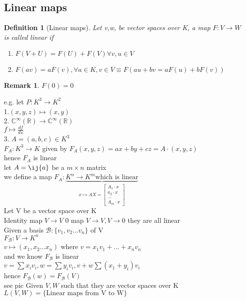 \documentclass{article}
\newtheorem*{definition}{Definition}
\newtheorem*{remark}{Remark}
\newcommand{\R}{\mathbb{R}}
\newcommand{\C}{\mathbb{C}}
\newcommand\m[1]{\begin{bmatrix}#1\end{bmatrix}}
\newcommand{\cd}{\cdot}
\newcommand{\vs}{v_1,v_2\dots v_n}
\newcommand{\mn}{m \times n}
\newcommand{\brac}[1]{\{#1\}}
\begin{document}
\subsection{Linear maps}
\begin{definition}
    [Linear maps] Let v,w, be vector spaces over K, a map $F: V\to W$ is called linear if 
    \begin{enumerate}
        \item $F(V+U)=F(U)+F(V) \forall v,u \in V$
        \item $F(av)=aF(v), \forall a \in K, v\in V \equiv F(au+bv=aF(u)+bF(v))$
    \end{enumerate}
\end{definition}
\begin{remark}
    $F(0)=0$
\end{remark}
e.g. let $P: K^3\to K^2$
\\1.$(x,y,z) \mapsto (x,y)$\\
2. $\C^\infty (\R) \to \C^\infty(\R)$\\$f \mapsto \frac{df}{dx}$\\
3. $A=(a,b,c)\in K^3$\\
$F_A: K^3 \to K$ given by $F_A(x,y,z)=ax+by+cz=A\cd(x,y,z)$
\\hence $F_A$ is linear\\
let $A=\ij{a}$ be a $\mn$ matrix\\
we define a map $F_A:\underbrace{K^n \to K^m \text{which is linear}}_{x \mapsto AX=\m{A_1\cd x\\a_2\cd x\\\dots\\A_m\cd x}}$
\\Let V be a vector space over K\\
Identity map $V\to V$ 0 map $V\to V, V\to 0$ they are all linear\\
Given a basis $ \mathcal{B}: \brac{\vs}$ of V\\
$F_{\mathcal{B}}: V\to K^n$\\
$v\mapsto (x_1,x_2\dots x_n)$ where $v=x_1v_1+\dots+x_nv_n $\\
and we know $F_\mathcal{B}$ is linear\\
$v=\sum x_iv_i, w=\sum y_iv_i, v+w\sum(x_1+y_i)v_i$\\
hence $F_\mathcal{B}(w)=F_\mathcal{B}(V)$\\
see pic
Given $V,W$ such that they are vector spaces over K\\
$L(V,W)=\brac{\text{Linear maps from V to W}}$\\
\end{document}
